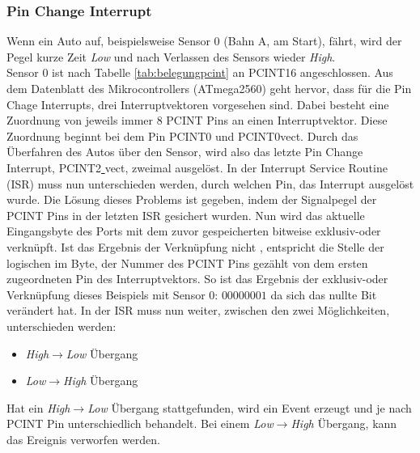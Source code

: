 \documentclass[a4paper, 11pt]{report}
\begin{document}
			\subsubsection {Pin Change Interrupt}\label{subsubsec:PCINT}
			Wenn ein Auto auf, beispielsweise Sensor 0 (Bahn A, am Start), fährt, wird der Pegel kurze Zeit \emph{Low} und nach Verlassen des Sensors wieder \emph{High}.\\ Sensor 0 ist nach Tabelle \ref{tab:belegungpcint} an PCINT16 angeschlossen. Aus dem Datenblatt des Mikrocontrollers (ATmega2560) geht hervor, dass für die Pin Chage Interrupts, drei Interruptvektoren vorgesehen sind. Dabei besteht eine Zuordnung von jeweils immer 8 PCINT Pins an einen Interruptvektor. Diese Zuordnung beginnt bei dem Pin PCINT0 und PCINT0\underline{}vect. Durch das Überfahren des Autos über den Sensor, wird also das letzte Pin Change Interrupt, PCINT2\underline{ }vect, zweimal ausgelöst. In der Interrupt Service Routine (ISR) muss nun unterschieden werden, durch welchen Pin, das Interrupt ausgelöst wurde.
			Die Lösung dieses Problems ist gegeben, indem der Signalpegel der PCINT Pins in der letzten ISR gesichert wurden. Nun wird das aktuelle Eingangsbyte des Ports mit dem zuvor gespeicherten bitweise exklusiv-oder verknüpft.
Ist das Ergebnis der Verknüpfung nicht \grqq, entspricht die Stelle der logischen \grqq im Byte, der Nummer des PCINT Pins gezählt von dem ersten zugeordneten Pin des Interruptvektors. So ist das Ergebnis der exklusiv-oder Verknüpfung dieses Beispiels mit Sensor 0: $00000001$ da sich das nullte Bit verändert hat. 
In der ISR muss nun weiter, zwischen den zwei Möglichkeiten, unterschieden werden:
				\begin{itemize}
					\item \emph{High$\rightarrow$Low} Übergang
					\item \emph{Low$\rightarrow$High} Übergang
				\end{itemize}
			Hat ein \emph{High$\rightarrow$Low} Übergang stattgefunden, wird ein Event erzeugt und je nach PCINT Pin unterschiedlich behandelt.
			Bei einem \emph{Low$\rightarrow$High} Übergang, kann das Ereignis verworfen werden.
\end{document}
